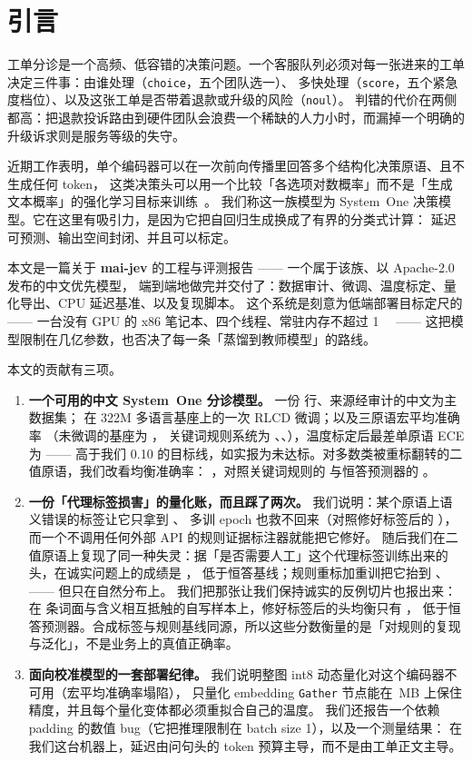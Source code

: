 \documentclass[11pt,a4paper]{article}
\begin{document}
\section{引言}

工单分诊是一个高频、低容错的决策问题。一个客服队列必须对每一张进来的工单决定三件事：由谁处理（\texttt{choice}，五个团队选一）、
多快处理（\texttt{score}，五个紧急度档位）、以及这张工单是否带着退款或升级的风险（\texttt{noul}）。
判错的代价在两侧都高：把退款投诉路由到硬件团队会浪费一个稀缺的人力小时，而漏掉一个明确的升级诉求则是服务等级的失守。

近期工作表明，单个编码器可以在一次前向传播里回答多个结构化决策原语、且不生成任何 token，
这类决策头可以用一个比较「各选项对数概率」而不是「生成文本概率」的强化学习目标来训练~\cite{laya}。
我们称这一族模型为 System~One 决策模型。它在这里有吸引力，是因为它把自回归生成换成了有界的分类式计算：
延迟可预测、输出空间封闭、并且可以标定。

本文是一篇关于 \textbf{mai-jev} 的工程与评测报告 —— 一个属于该族、以 Apache-2.0 发布的中文优先模型，
端到端地做完并交付了：数据审计、微调、温度标定、量化导出、CPU 延迟基准、以及复现脚本。
这个系统是刻意为低端部署目标定尺的 —— 一台没有 GPU 的 x86 笔记本、四个线程、常驻内存不超过 \SI{1}{\giga\byte} ——
这把模型限制在几亿参数，也否决了每一条「蒸馏到教师模型」的路线。

本文的贡献有三项。

\begin{enumerate}
  \item \textbf{一个可用的中文 System~One 分诊模型。} 一份 \DataTotalRows{} 行、来源经审计的中文为主数据集；
  在 322M 多语言基座上的一次 RLCD 微调；以及三原语宏平均准确率 \MacroAcc{}（未微调的基座为 \OrigAccMacro{}，
  关键词规则系统为 \RulesAccChoice{}、\RulesAccScore{}、\RulesAccNoul{}），温度标定后最差单原语 ECE 为 \WorstEce{} ——
  高于我们 \num{0.10} 的目标线，如实报为未达标。对多数类被重标翻转的二值原语，我们改看均衡准确率：
  \BAccNoul{}，对照关键词规则的 \RulesBAccNoul{} 与恒答预测器的 \MajAccNoul{}。
  \item \textbf{一份「代理标签损害」的量化账，而且踩了两次。} 我们说明：某个原语上语义错误的标签让它只拿到 \AccScoreVZeroTwo{}、
  多训 epoch 也救不回来（对照修好标签后的 \AccScore{}），而一个不调用任何外部 API 的规则证据标注器就能把它修好。
  随后我们在二值原语上复现了同一种失灵：据「是否需要人工」这个代理标签训练出来的头，在诚实问题上的成绩是 \OldHeadAccNoul{}，
  低于恒答基线；规则重标加重训把它抬到 \AccNoul{}、\BAccNoul{} —— 但只在自然分布上。
  我们把那张让我们保持诚实的反例切片也报出来：在 \AntibodyN{} 条词面与含义相互抵触的自写样本上，修好标签后的头均衡只有 \AntibodyBAcc{}，
  低于恒答预测器。合成标签与规则基线同源，所以这些分数衡量的是「对规则的复现与泛化」，不是业务上的真值正确率。
  \item \textbf{面向校准模型的一套部署纪律。} 我们说明整图 int8 动态量化对这个编码器不可用（宏平均准确率塌陷），
  只量化 embedding \texttt{Gather} 节点能在 \ModelMb\,MB 上保住精度，并且每个量化变体都必须重拟合自己的温度。
  我们还报告一个依赖 padding 的数值 bug（它把推理限制在 batch size 1），以及一个测量结果：
  在我们这台机器上，延迟由问句头的 token 预算主导，而不是由工单正文主导。
\end{enumerate}
\end{document}
